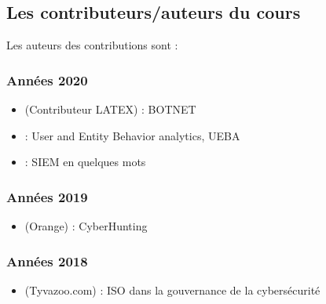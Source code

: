 
\subsection{Les contributeurs/auteurs du cours}

Les auteurs des contributions sont :

\subsubsection{Années 2020}

\begin{itemize}
  \item {}  (Contributeur LATEX) : BOTNET
\end{itemize}

\begin{itemize}
  \item {}  : User and Entity Behavior analytics, UEBA
\end{itemize}

\begin{itemize}
  \item {}  : SIEM en quelques mots
 \end{itemize}

\subsubsection{Années 2019}

\begin{itemize}
  \item {} (Orange) : CyberHunting
\end{itemize}

\subsubsection{Années 2018}

\begin{itemize}
  \item {} (Tyvazoo.com) : ISO dans la gouvernance de la cybersécurité
\end{itemize}

